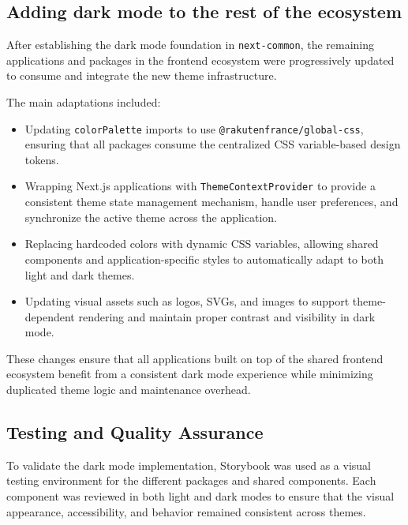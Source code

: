 \subsection{Adding dark mode to the rest of the ecosystem}

After establishing the dark mode foundation in \lstinline|next-common|, the remaining applications and packages in the frontend ecosystem were progressively updated to consume and integrate the new theme infrastructure.

The main adaptations included:

\begin{itemize}
    \item Updating \lstinline|colorPalette| imports to use \lstinline|@rakutenfrance/global-css|, ensuring that all packages consume the centralized CSS variable-based design tokens.
    
    \item Wrapping Next.js applications with \lstinline|ThemeContextProvider| to provide a consistent theme state management mechanism, handle user preferences, and synchronize the active theme across the application.
    
    \item Replacing hardcoded colors with dynamic CSS variables, allowing shared components and application-specific styles to automatically adapt to both light and dark themes.
    
    \item Updating visual assets such as logos, SVGs, and images to support theme-dependent rendering and maintain proper contrast and visibility in dark mode.
\end{itemize}

These changes ensure that all applications built on top of the shared frontend ecosystem benefit from a consistent dark mode experience while minimizing duplicated theme logic and maintenance overhead.

\subsection{Testing and Quality Assurance}

To validate the dark mode implementation, Storybook was used as a visual testing environment for the different packages and shared components. Each component was reviewed in both light and dark modes to ensure that the visual appearance, accessibility, and behavior remained consistent across themes.

